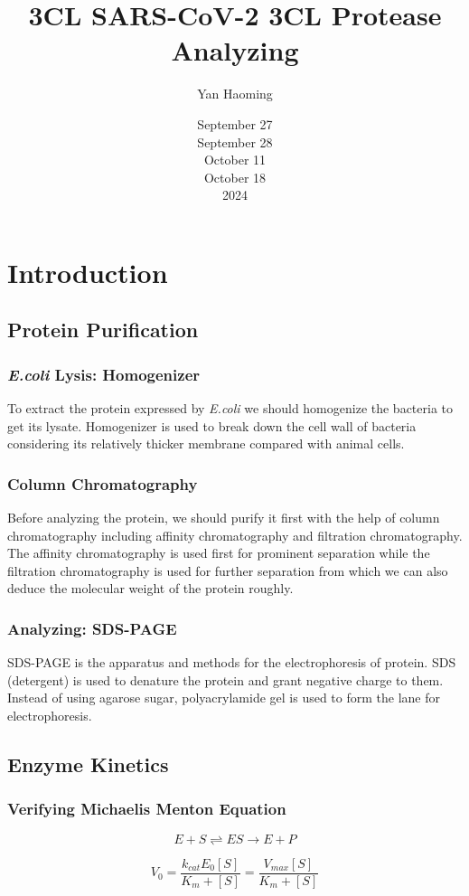 \documentclass{report}
\title{3CL SARS-CoV-2 3CL Protease Analyzing}
\author{Yan Haoming}
\date{September 27\\September 28\\October 11\\October 18\\2024}
\begin{document}
\maketitle
\chapter{Introduction}
\section{Protein Purification}
\subsection{\textit{E.coli} Lysis: Homogenizer}
To extract the protein expressed by \textit{E.coli} we should homogenize the bacteria to get its lysate.
Homogenizer is used to break down the cell wall of bacteria considering its relatively thicker membrane compared with animal cells.
\subsection{Column Chromatography}
Before analyzing the protein, we should purify it first with the help of column chromatography including affinity chromatography and filtration chromatography.
The affinity chromatography is used first for prominent separation while the filtration chromatography is used for further separation from which we can also deduce the molecular weight of the protein roughly.
\subsection{Analyzing: SDS-PAGE}
SDS-PAGE is the apparatus and methods for the electrophoresis of protein.
SDS (detergent) is used to denature the protein and grant negative charge to them.
Instead of using agarose sugar, polyacrylamide gel is used to form the lane for electrophoresis.
\section{Enzyme Kinetics}
\subsection{Verifying Michaelis Menton Equation}
$$
E + S \rightleftharpoons ES \rightarrow E+P
$$

$$
V_0 =\frac{k_{cat}E_0[S]}{K_m+[S]}=\frac{V_{max}[S]}{K_m+[S]}
$$
\end{document}
